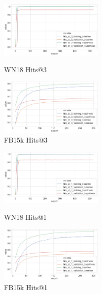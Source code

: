 \begin{figure}[H]
	\parbox{.5\linewidth}{
   		\centering
    		\includegraphics[width=0.45\textwidth, height=0.2\textheight]{WN18_hits_at_3_Results}
		\caption{WN18 Hits@3}
		}
	\hfill
	\parbox{.5\linewidth}{
   		\centering
		\includegraphics[width=0.45\textwidth, height=0.2\textheight]{FB15k_hits_at_3_Results}
		\caption{FB15k Hits@3}
		}
\end{figure}


\begin{figure}[H]
	\parbox{.5\linewidth}{
   		\centering
    		\includegraphics[width=0.45\textwidth, height=0.2\textheight]{WN18_hits_at_1_Results}
		\caption{WN18 Hits@1}
		}
	\hfill
	\parbox{.5\linewidth}{
   		\centering
		\includegraphics[width=0.45\textwidth, height=0.2\textheight]{FB15k_hits_at_1_Results}
		\caption{FB15k Hits@1}
		}
\end{figure}


